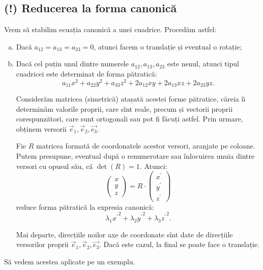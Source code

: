 \subsection{(!) Reducerea la forma canonică}

\indent\indent Vrem să stabilim ecuația canonică a unei cuadrice. Procedăm
astfel:
\begin{enumerate}[(a)]
	\item Dacă $a_{12} = a_{13} = a_{23} = 0$, atunci facem o translație și
eventual o rotație;
    \item Dacă cel puțin unul dintre numerele $a_{12}, a_{13}, a_{23}$ este
nenul, atunci tipul cuadricei este determinat de forma pătratică: 
 \[
	a_{11} x^2 + a_{22} y^2 + a_{33} z^2 + 2a_{12} xy + 2a_{13} xz + 2a_{23}yz.
\]

Considerăm matricea (simetrică) atașată acestei forme pătratice, căreia îi
determinăm valorile proprii, care sînt reale, precum și vectorii proprii
corespunzători, care sunt ortogonali sau pot fi făcuți astfel. Prin urmare,
obținem versorii $\vec{e}_1, \vec{e}_2, \vec{e_3}$.

Fie $R$ matricea formată de coordonatele acestor versori, aranjate pe coloane.
Putem presupune, eventual după o renumerotare sau înlocuirea unuia dintre 
versori cu opusul său, că $\det(R) = 1$. Atunci: 
 \[
	\begin{pmatrix}
	    x \\ y \\ z
    \end{pmatrix} = R \cdot \begin{pmatrix}
	                            x^{\prime} \\ y^{\prime} \\ z^{\prime}
                            \end{pmatrix}
\]
reduce forma pătratică la expresia canonică: 
 \[
\lambda_1 {x^{\prime}}^2 + \lambda_2 {y^{\prime}}^2 + \lambda_3 {z^{\prime}}^2.
\]

Mai departe, direcțiile noilor axe de coordonate sînt date de direcțiile 
versorilor proprii $\vec{e}_1, \vec{e}_2, \vec{e_3}$. Dacă este cazul, la final
se poate face o translație.
\end{enumerate}

Să vedem acestea aplicate pe un exemplu.

